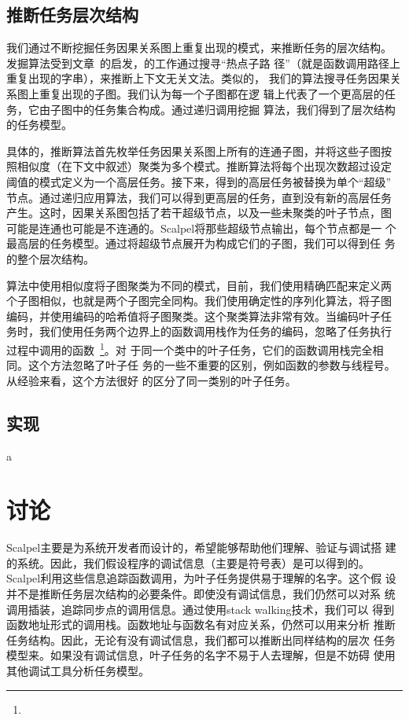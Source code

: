

\subsection{推断任务层次结构}

我们通过不断挖掘任务因果关系图上重复出现的模式，来推断任务的层次结构。
发掘算法受到文章~\cite{wpp}的启发，\cite{wpp}的工作通过搜寻“热点子路
径”（就是函数调用路径上重复出现的字串），来推断上下文无关文法。类似的，
我们的算法搜寻任务因果关系图上重复出现的子图。我们认为每一个子图都在逻
辑上代表了一个更高层的任务，它由子图中的任务集合构成。通过递归调用挖掘
算法，我们得到了层次结构的任务模型。

具体的，推断算法首先枚举任务因果关系图上所有的连通子图，并将这些子图按
照相似度（在下文中叙述）聚类为多个模式。推断算法将每个出现次数超过设定
阈值的模式定义为一个高层任务。接下来，得到的高层任务被替换为单个“超级”
节点。通过递归应用算法，我们可以得到更高层的任务，直到没有新的高层任务
产生。这时，因果关系图包括了若干超级节点，以及一些未聚类的叶子节点，图
可能是连通也可能是不连通的。Scalpel将那些超级节点输出，每个节点都是一
个最高层的任务模型。通过将超级节点展开为构成它们的子图，我们可以得到任
务的整个层次结构。

算法中使用相似度将子图聚类为不同的模式，目前，我们使用精确匹配来定义两
个子图相似，也就是两个子图完全同构。我们使用确定性的序列化算法，将子图
编码，并使用编码的哈希值将子图聚类。这个聚类算法非常有效。当编码叶子任
务时，我们使用任务两个边界上的函数调用栈作为任务的编码，忽略了任务执行
过程中调用的函数~\footnote{}。对
于同一个类中的叶子任务，它们的函数调用栈完全相同。这个方法忽略了叶子任
务的一些不重要的区别，例如函数的参数与线程号。从经验来看，这个方法很好
的区分了同一类别的叶子任务。


\subsection{实现}

a

\section{讨论}

Scalpel主要是为系统开发者而设计的，希望能够帮助他们理解、验证与调试搭
建的系统。因此，我们假设程序的调试信息（主要是符号表）是可以得到的。
Scalpel利用这些信息追踪函数调用，为叶子任务提供易于理解的名字。这个假
设并不是推断任务层次结构的必要条件。即使没有调试信息，我们仍然可以对系
统调用插装，追踪同步点的调用信息。通过使用stack walking技术，我们可以
得到函数地址形式的调用栈。函数地址与函数名有对应关系，仍然可以用来分析
推断任务结构。因此，无论有没有调试信息，我们都可以推断出同样结构的层次
任务模型来。如果没有调试信息，叶子任务的名字不易于人去理解，但是不妨碍
使用其他调试工具分析任务模型。

